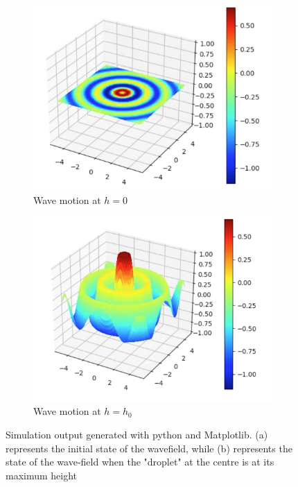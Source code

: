 \begin{figure}[h]
    \begin{subfigure}{0.5\textwidth}
        \centering
        \includegraphics[width=\linewidth]{simulation/basich0.png}
        \caption{Wave motion at $h=0$}
    \end{subfigure}
    \begin{subfigure}{0.5\textwidth}
        \centering
        \includegraphics[width=\linewidth]{simulation/basichmax.png}
        \caption{Wave motion at $h=h_0$}
    \end{subfigure}
\caption{Simulation output generated with python and Matplotlib. (a) represents the initial state of the wavefield, while (b) represents the state of the wave-field when the "droplet" at the centre is at its maximum height}
\label{fig:basicAnimation}
\end{figure}


